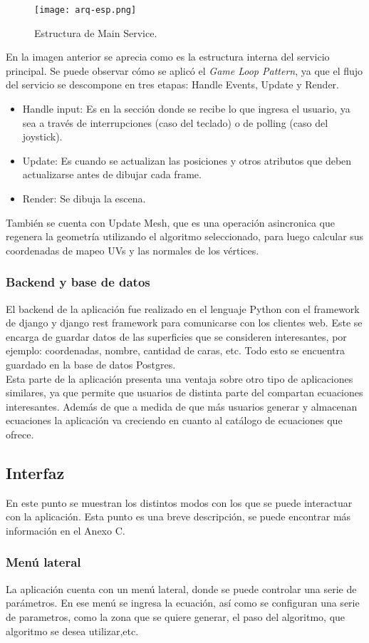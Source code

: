 \documentclass[12pt]{article}
\begin{document}
\clearpage
\begin{figure}[h]
\texttt{[image: arq-esp.png]}
\caption{Estructura de Main Service.}
\end{figure}
En la imagen anterior se aprecia como es la estructura interna del servicio principal. Se puede observar cómo se aplicó el \textit{Game Loop Pattern}, ya que el flujo del servicio se descompone en tres etapas: Handle Events, Update y Render.
\begin{itemize}
\item Handle input: Es en la sección donde se recibe lo que ingresa el usuario, ya sea a través de interrupciones (caso del teclado) o de polling (caso del joystick).
\item Update: Es cuando se actualizan las posiciones y otros atributos que deben actualizarse antes de dibujar cada frame.
\item Render: Se dibuja la escena.
\end{itemize}
También se cuenta con Update Mesh, que es una operación asincronica que regenera la geometría utilizando el algoritmo seleccionado, para luego calcular sus coordenadas de mapeo UVs y las normales de los vértices.
\subsubsection{Backend y base de datos}
El backend de la aplicación fue realizado en el lenguaje Python con el framework de django y django rest framework para comunicarse con los clientes web. Este se encarga de guardar datos de las superficies que se consideren interesantes, por ejemplo: coordenadas, nombre, cantidad de caras, etc. Todo esto se encuentra guardado en la base de datos Postgres.
\\Esta parte de la aplicación presenta una ventaja sobre otro tipo de aplicaciones similares, ya que permite que usuarios de distinta parte del compartan ecuaciones interesantes. Además de que a medida de que más usuarios generar y almacenan ecuaciones la aplicación va creciendo en cuanto al catálogo de ecuaciones que ofrece.
\clearpage
\subsection{Interfaz}
En este punto se muestran los distintos modos con los que se puede interactuar con la aplicación. Esta punto es una breve descripción, se puede encontrar más información en el Anexo C.
\subsubsection{Menú lateral}
La aplicación cuenta con un menú lateral, donde se puede controlar una serie de parámetros. En ese menú se ingresa la ecuación, así como se configuran una serie de parametros, como la zona que se quiere generar, el paso del algoritmo, que algoritmo se desea utilizar,etc. 
\end{document}
